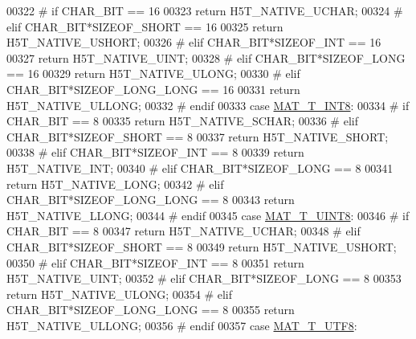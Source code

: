 \begin{DoxyCode}
00322 \textcolor{preprocessor}{#       if CHAR\_BIT == 16}
00323             \textcolor{keywordflow}{return} H5T\_NATIVE\_UCHAR;
00324 \textcolor{preprocessor}{#       elif CHAR\_BIT*SIZEOF\_SHORT == 16}
00325             \textcolor{keywordflow}{return} H5T\_NATIVE\_USHORT;
00326 \textcolor{preprocessor}{#       elif CHAR\_BIT*SIZEOF\_INT == 16}
00327             \textcolor{keywordflow}{return} H5T\_NATIVE\_UINT;
00328 \textcolor{preprocessor}{#       elif CHAR\_BIT*SIZEOF\_LONG == 16}
00329             \textcolor{keywordflow}{return} H5T\_NATIVE\_ULONG;
00330 \textcolor{preprocessor}{#       elif CHAR\_BIT*SIZEOF\_LONG\_LONG == 16}
00331             \textcolor{keywordflow}{return} H5T\_NATIVE\_ULLONG;
00332 \textcolor{preprocessor}{#       endif}
00333         \textcolor{keywordflow}{case} \hyperlink{group___m_a_t_ggacf7b3b879282b7ab3a51190e49bf3453a9807f5033ed4f9b548953742d9fd1658}{MAT\_T\_INT8}:
00334 \textcolor{preprocessor}{#       if CHAR\_BIT == 8}
00335             \textcolor{keywordflow}{return} H5T\_NATIVE\_SCHAR;
00336 \textcolor{preprocessor}{#       elif CHAR\_BIT*SIZEOF\_SHORT == 8}
00337             \textcolor{keywordflow}{return} H5T\_NATIVE\_SHORT;
00338 \textcolor{preprocessor}{#       elif CHAR\_BIT*SIZEOF\_INT == 8}
00339             \textcolor{keywordflow}{return} H5T\_NATIVE\_INT;
00340 \textcolor{preprocessor}{#       elif CHAR\_BIT*SIZEOF\_LONG == 8}
00341             \textcolor{keywordflow}{return} H5T\_NATIVE\_LONG;
00342 \textcolor{preprocessor}{#       elif CHAR\_BIT*SIZEOF\_LONG\_LONG == 8}
00343             \textcolor{keywordflow}{return} H5T\_NATIVE\_LLONG;
00344 \textcolor{preprocessor}{#       endif}
00345         \textcolor{keywordflow}{case} \hyperlink{group___m_a_t_ggacf7b3b879282b7ab3a51190e49bf3453a01c1bd7db68f90552862eb5d311be408}{MAT\_T\_UINT8}:
00346 \textcolor{preprocessor}{#       if CHAR\_BIT == 8}
00347             \textcolor{keywordflow}{return} H5T\_NATIVE\_UCHAR;
00348 \textcolor{preprocessor}{#       elif CHAR\_BIT*SIZEOF\_SHORT == 8}
00349             \textcolor{keywordflow}{return} H5T\_NATIVE\_USHORT;
00350 \textcolor{preprocessor}{#       elif CHAR\_BIT*SIZEOF\_INT == 8}
00351             \textcolor{keywordflow}{return} H5T\_NATIVE\_UINT;
00352 \textcolor{preprocessor}{#       elif CHAR\_BIT*SIZEOF\_LONG == 8}
00353             \textcolor{keywordflow}{return} H5T\_NATIVE\_ULONG;
00354 \textcolor{preprocessor}{#       elif CHAR\_BIT*SIZEOF\_LONG\_LONG == 8}
00355             \textcolor{keywordflow}{return} H5T\_NATIVE\_ULLONG;
00356 \textcolor{preprocessor}{#       endif}
00357         \textcolor{keywordflow}{case} \hyperlink{group___m_a_t_ggacf7b3b879282b7ab3a51190e49bf3453ac34ad81f5cbd3b7d0d95e57e5be0149b}{MAT\_T\_UTF8}:

\end{DoxyCode}

